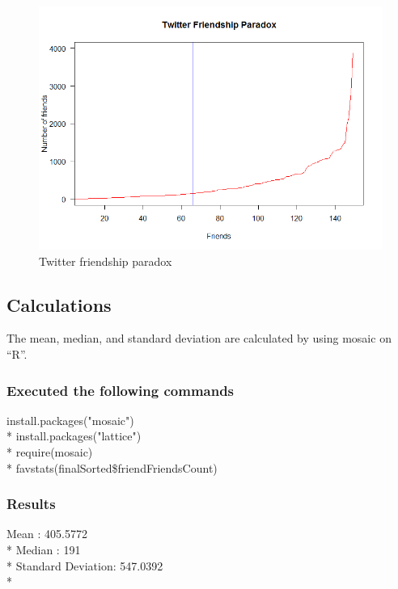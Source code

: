 \documentclass[12pt]{article}
\begin{document}
\begin{figure}[ht]
\includegraphics[scale=0.7]{../twitter/curveScatterPlot}
\centering
\caption{Twitter friendship paradox}

\label{scaled-scatterplot}
\end{figure}

\subsection{Calculations}
The mean, median, and standard deviation are calculated by using mosaic on ``R''.
\subsubsection{Executed the following commands}
install.packages("mosaic")\\*
install.packages("lattice")\\*
require(mosaic)\\*
favstats(finalSorted\$friendFriendsCount)
\subsubsection{Results}
Mean              : 405.5772\\*
Median            : 191\\*
Standard Deviation: 547.0392\\*
\newpage



\end{document}
